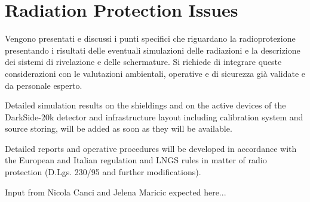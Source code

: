 \section{Radiation Protection Issues}
\label{sec:RadioProtection}

{\bf\color{red}

Vengono presentati e discussi i punti specifici che riguardano la radioprotezione presentando i risultati delle eventuali simulazioni delle radiazioni e la descrizione dei sistemi di rivelazione e delle schermature. Si richiede di integrare queste considerazioni con le valutazioni ambientali, operative e di sicurezza gi\`a validate e da personale esperto.
}
\vspace{1cm}

Detailed simulation results on the shieldings and on the active devices of the DarkSide-20k detector and infrastructure layout including calibration system and source storing, will be added as soon as they will be available.

Detailed reports and operative procedures will be developed in accordance with the European and Italian regulation and LNGS rules in matter of radio protection (D.Lgs. 230/95 and further modifications).


Input from Nicola Canci and Jelena Maricic expected here...

